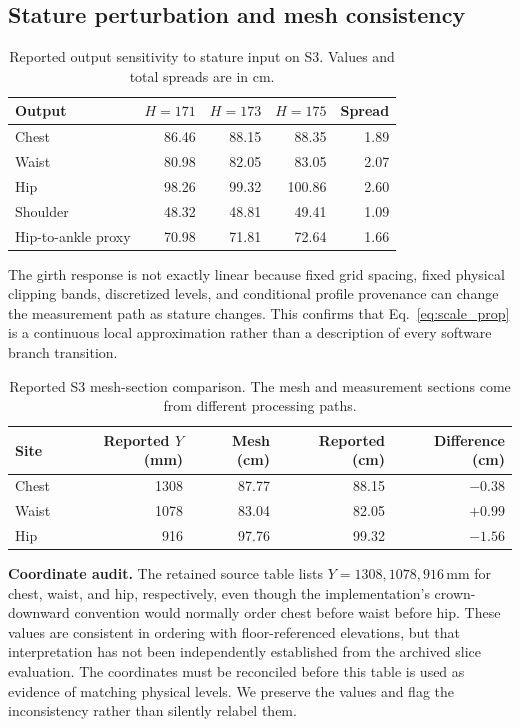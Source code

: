 \documentclass[11pt,a4paper]{article}
\numberwithin{equation}{section}
\begin{document}
\subsection{Stature perturbation and mesh consistency}
\begin{table}[htbp]
\centering\small
\caption{Reported output sensitivity to stature input on S3. Values and total spreads are in cm.}
\label{tab:stature_pert}
\begin{tabular}{lrrrr}
\toprule
Output & $H=171$ & $H=173$ & $H=175$ & Spread \\
\midrule
Chest & 86.46 & 88.15 & 88.35 & 1.89 \\
Waist & 80.98 & 82.05 & 83.05 & 2.07 \\
Hip & 98.26 & 99.32 & 100.86 & 2.60 \\
Shoulder & 48.32 & 48.81 & 49.41 & 1.09 \\
Hip-to-ankle proxy & 70.98 & 71.81 & 72.64 & 1.66 \\
\bottomrule
\end{tabular}
\end{table}
The girth response is not exactly linear because fixed grid spacing, fixed physical clipping bands, discretized levels, and conditional profile provenance can change the measurement path as stature changes. This confirms that Eq.~\eqref{eq:scale_prop} is a continuous local approximation rather than a description of every software branch transition.

\begin{table}[htbp]
\centering\small
\caption{Reported S3 mesh-section comparison. The mesh and measurement sections come from different processing paths.}
\label{tab:mesh_slice}
\begin{tabular}{lrrrr}
\toprule
Site & Reported $Y$ (mm) & Mesh (cm) & Reported (cm) & Difference (cm) \\
\midrule
Chest & 1308 & 87.77 & 88.15 & $-0.38$ \\
Waist & 1078 & 83.04 & 82.05 & $+0.99$ \\
Hip & 916 & 97.76 & 99.32 & $-1.56$ \\
\bottomrule
\end{tabular}
\end{table}
\textbf{Coordinate audit.} The retained source table lists $Y=1308,1078,916$\,mm for chest, waist, and hip, respectively, even though the implementation's crown-downward convention would normally order chest before waist before hip. These values are consistent in ordering with floor-referenced elevations, but that interpretation has not been independently established from the archived slice evaluation. The coordinates must be reconciled before this table is used as evidence of matching physical levels. We preserve the values and flag the inconsistency rather than silently relabel them.
\end{document}

